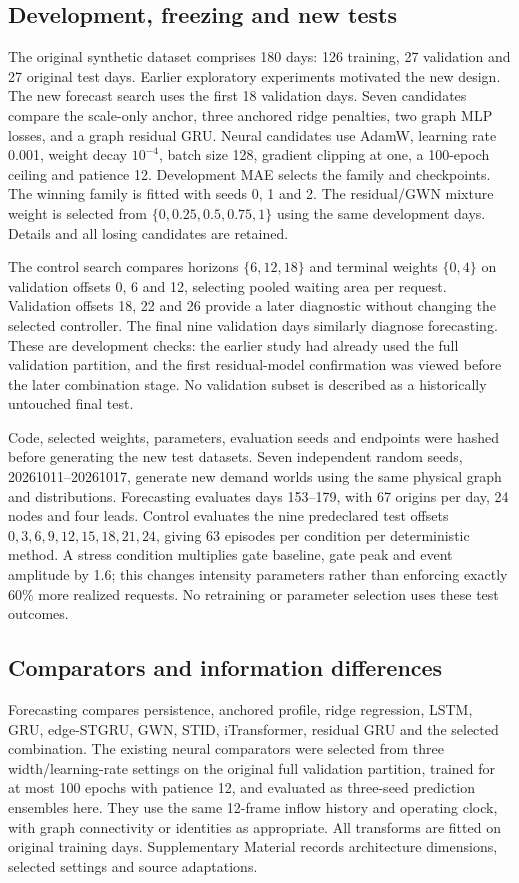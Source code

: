 \subsection{Development, freezing and new tests}
The original synthetic dataset comprises 180 days: 126 training, 27 validation and 27 original test days. Earlier exploratory experiments motivated the new design. The new forecast search uses the first 18 validation days. Seven candidates compare the scale-only anchor, three anchored ridge penalties, two graph MLP losses, and a graph residual GRU. Neural candidates use AdamW, learning rate 0.001, weight decay $10^{-4}$, batch size 128, gradient clipping at one, a 100-epoch ceiling and patience 12. Development MAE selects the family and checkpoints. The winning family is fitted with seeds 0, 1 and 2. The residual/GWN mixture weight is selected from $\{0,0.25,0.5,0.75,1\}$ using the same development days. Details and all losing candidates are retained.

The control search compares horizons $\{6,12,18\}$ and terminal weights $\{0,4\}$ on validation offsets 0, 6 and 12, selecting pooled waiting area per request. Validation offsets 18, 22 and 26 provide a later diagnostic without changing the selected controller. The final nine validation days similarly diagnose forecasting. These are development checks: the earlier study had already used the full validation partition, and the first residual-model confirmation was viewed before the later combination stage. No validation subset is described as a historically untouched final test.

Code, selected weights, parameters, evaluation seeds and endpoints were hashed before generating the new test datasets. Seven independent random seeds, 20261011--20261017, generate new demand worlds using the same physical graph and distributions. Forecasting evaluates days 153--179, with 67 origins per day, 24 nodes and four leads. Control evaluates the nine predeclared test offsets $0,3,6,9,12,15,18,21,24$, giving 63 episodes per condition per deterministic method. A stress condition multiplies gate baseline, gate peak and event amplitude by 1.6; this changes intensity parameters rather than enforcing exactly 60\% more realized requests. No retraining or parameter selection uses these test outcomes.

\subsection{Comparators and information differences}
Forecasting compares persistence, anchored profile, ridge regression, LSTM, GRU, edge-STGRU, GWN, STID, iTransformer, residual GRU and the selected combination. The existing neural comparators were selected from three width/learning-rate settings on the original full validation partition, trained for at most 100 epochs with patience 12, and evaluated as three-seed prediction ensembles here. They use the same 12-frame inflow history and operating clock, with graph connectivity or identities as appropriate. All transforms are fitted on original training days. Supplementary Material records architecture dimensions, selected settings and source adaptations.

